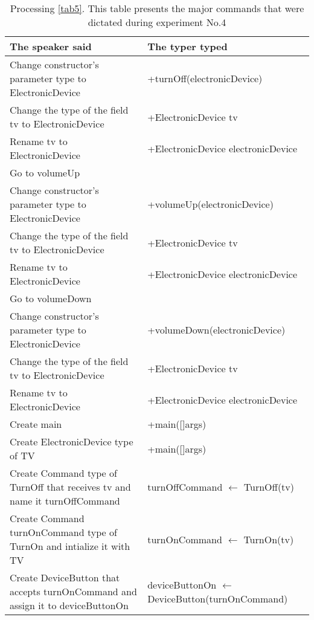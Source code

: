 \begin{table}[H]
	\begin{tabular}{|p{10cm}|p{6cm}|}
		\hline
		\rowcolor[HTML]{9B9B9B} 
		{\color[HTML]{000000} The speaker said} & {\color[HTML]{000000} The typer typed} \\ \hline
		Change constructor's parameter type to ElectronicDevice & +turnOff(electronicDevice) \\ \hline
		Change the type of the field tv to ElectronicDevice & +ElectronicDevice tv \\ \hline
		Rename tv to ElectronicDevice & +ElectronicDevice electronicDevice \\ \hline
		Go to volumeUp & \\ \hline
		Change constructor's parameter type to ElectronicDevice & +volumeUp(electronicDevice) \\ \hline
		Change the type of the field tv to ElectronicDevice & +ElectronicDevice tv \\ \hline
		Rename tv to ElectronicDevice & +ElectronicDevice electronicDevice \\ \hline
		Go to volumeDown & \\ \hline
		Change constructor's parameter type to ElectronicDevice & +volumeDown(electronicDevice) \\ \hline
		Change the type of the field tv to ElectronicDevice & +ElectronicDevice tv \\ \hline
		Rename tv to ElectronicDevice & +ElectronicDevice electronicDevice \\ \hline
		Create main & +main([]args) \\ \hline
		Create ElectronicDevice type of TV & +main([]args) \\ \hline
		Create Command type of TurnOff that receives tv and name it turnOffCommand & turnOffCommand $\leftarrow$ TurnOff(tv) \\ \hline
		Create Command turnOnCommand type of TurnOn and intialize it with TV & turnOnCommand $\leftarrow$ TurnOn(tv) \\ \hline
		Create DeviceButton that accepts turnOnCommand and assign it to deviceButtonOn & deviceButtonOn $\leftarrow$ DeviceButton(turnOnCommand)\\ \hline
	\end{tabular}
	\caption{Processing \autoref{tab5}. This table presents the major commands that were dictated during experiment No.4}
	\label{tab6}
\end{table}
